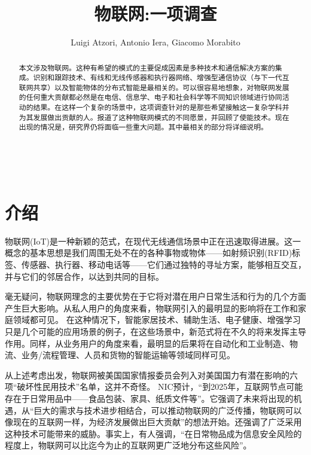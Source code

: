 \documentclass[12pt,a4paper]{article}%
\title{\fontsize{18pt}{27pt}\selectfont%
	{\heiti%
	物联网:一项调查}}%
\author{\fontsize{12pt}{18pt}\selectfont%
	{\fangsong%
	Luigi Atzori, Antonio Iera, Giacomo Morabito}\\%
	}%
\date{}%
\begin{document}
	\maketitle%
	\lhead{}%
	\chead{}%
	\rhead{}%
	\lfoot{}%
	\cfoot{\thepage}%
	\rfoot{}%
	\begin{abstract}
		\fangsong 本文涉及物联网。这种有希望的模式的主要促成因素是多种技术和通信解决方案的集成。识别和跟踪技术、有线和无线传感器和执行器网络、增强型通信协议（与下一代互联网共享）以及智能物体的分布式智能是最相关的。可以很容易地想象，对物联网发展的任何重大贡献都必然是在电信、信息学、电子和社会科学等不同知识领域进行协同活动的结果。在这样一个复杂的场景中，这项调查针对的是那些希望接触这一复杂学科并为其发展做出贡献的人。报道了这种物联网模式的不同愿景，并回顾了使能技术。现在出现的情况是，研究界仍将面临一些重大问题。其中最相关的部分将详细说明。
	\end{abstract}
	
	\begin{adjustwidth}{1.06cm}{1.06cm}
		\fontsize{10.5pt}{15.75pt}\\
	\end{adjustwidth}
	

	\newpage%


\section{介绍}
物联网(IoT)是一种新颖的范式，在现代无线通信场景中正在迅速取得进展。这一概念的基本思想是我们周围无处不在的各种事物或物体——如射频识别(RFID)标签、传感器、执行器、移动电话等——它们通过独特的寻址方案，能够相互交互，并与它们的邻居合作，以达到共同的目标。

毫无疑问，物联网理念的主要优势在于它将对潜在用户日常生活和行为的几个方面产生巨大影响。从私人用户的角度来看，物联网引入的最明显的影响将在工作和家庭领域都可见。
在这种情况下，智能家居技术、辅助生活、电子健康、增强学习只是几个可能的应用场景的例子，在这些场景中，新范式将在不久的将来发挥主导作用。同样，从业务用户的角度来看，最明显的后果将在自动化和工业制造、物流、业务/流程管理、人员和货物的智能运输等领域同样可见。

从上述考虑出发，物联网被美国国家情报委员会列入对美国国力有潜在影响的六项“破坏性民用技术”名单，这并不奇怪。
NIC预计，“到2025年，互联网节点可能存在于日常用品中——食品包装、家具、纸质文件等”。它强调了未来将出现的机遇，从“巨大的需求与技术进步相结合，可以推动物联网的广泛传播，物联网可以像现在的互联网一样，为经济发展做出巨大贡献”的想法开始。还强调了广泛采用这种技术可能带来的威胁。事实上，有人强调，“在日常物品成为信息安全风险的程度上，物联网可以比迄今为止的互联网更广泛地分布这些风险”。
\end{document}
